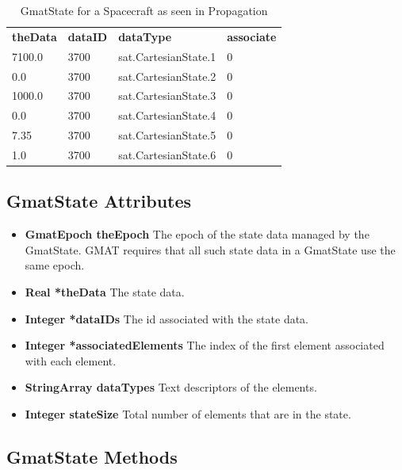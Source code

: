 \begin{table}
\begin{center}
\begin{tabular}{llll}
\textbf{theData} & \textbf{dataID} & \textbf{dataType} & \textbf{associate} \\
7100.0 & 3700 & sat.CartesianState.1 & 0 \\
0.0 & 3700 & sat.CartesianState.2 & 0 \\
1000.0 & 3700 & sat.CartesianState.3 & 0 \\
0.0 & 3700 & sat.CartesianState.4 & 0 \\
7.35 & 3700 & sat.CartesianState.5 & 0 \\
1.0 & 3700 & sat.CartesianState.6 & 0
\end{tabular}
\end{center}
\caption[GmatState for Propagation]{\label{table:GmatState}GmatState for a Spacecraft as seen in
Propagation}
\end{table}

\subsection{GmatState Attributes}

\begin{itemize}
\item\textbf{GmatEpoch theEpoch} The epoch of the state data managed by the GmatState.  GMAT
requires that all such state data in a GmatState use the same epoch.
\item\textbf{Real *theData} The state data.
\item\textbf{Integer *dataIDs}  The id associated with the state data.
\item\textbf{Integer *associatedElements}  The index of the first element associated with each
element.
\item\textbf{StringArray dataTypes}  Text descriptors of the elements.
\item\textbf{Integer stateSize} Total number of elements that are in the state.

\end{itemize}

\subsection{GmatState Methods}

